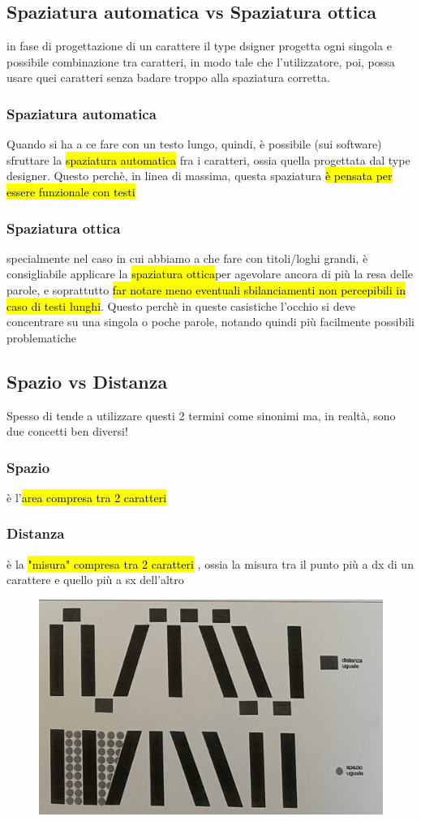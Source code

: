     \subsection{Spaziatura automatica vs Spaziatura ottica}
    in fase di progettazione di un carattere il type dsigner progetta ogni singola e possibile combinazione tra caratteri, in modo tale che l'utilizzatore, poi, possa usare quei caratteri senza badare troppo alla spaziatura corretta.
    
    
    \subsubsection{Spaziatura automatica}
    Quando si ha a ce fare con un testo lungo, quindi, è possibile (sui software) sfruttare la \hl{spaziatura automatica} fra i caratteri, ossia quella progettata dal type designer.
    Questo perchè, in linea di massima, questa spaziatura \hl{è pensata per essere funzionale con testi}
     \subsubsection{Spaziatura ottica}
     specialmente nel caso in cui abbiamo a che fare con titoli/loghi grandi, è consigliabile applicare la \hl{spaziatura ottica}per agevolare ancora di più la resa delle parole, e soprattutto \hl{far notare meno eventuali sbilanciamenti non percepibili in caso di testi lunghi}. Questo perchè in queste casistiche l'occhio si deve concentrare su una singola o poche parole, notando quindi più facilmente possibili problematiche


    \subsection{Spazio vs Distanza}
    Spesso di tende a utilizzare questi 2 termini come sinonimi ma, in realtà, sono due concetti ben diversi!
        \subsubsection{Spazio}
        è l'\hl{area compresa tra 2 caratteri}
        \subsubsection{Distanza}
        è la \hl{"misura" compresa tra 2 caratteri }, ossia la misura tra il punto più a dx di un carattere e quello più a sx dell'altro 
    \begin{figure}[H]
        \centering
        \includegraphics[width=0.2\linewidth]{blocco_2 - spiegazioni teorico-pratiche/imgs/Screenshot 2024-11-20 alle 23.42.15.png}
    \end{figure}

